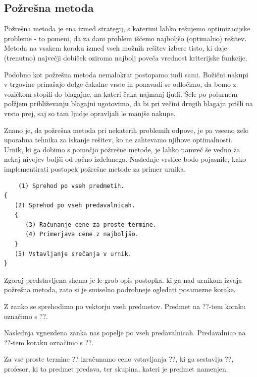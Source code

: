 \documentclass[a4paper, 10pt]{article}
\begin{document}
\subsection{Požrešna metoda}%

Požrešna metoda je ena izmed strategij, s katerimi lahko rešujemo optimizacijske probleme -
to pomeni, da za dani problem iščemo najboljšo (optimalno) rešitev. Metoda na vsakem koraku
izmed vseh možnih rešitev izbere  tisto, ki daje (trenutno) največji dobiček oziroma najbolj
poveča vrednost kriterijske funkcije.

Podobno kot požrešna metoda nemalokrat postopamo tudi sami. Božični nakupi v trgovine
prinašajo dolge čakalne vrste in ponavadi se odločimo, da bomo z vozičkom stopili do blagajne,
na kateri čaka najmanj ljudi. Šele po polurnem polžjem približevanju blagajni ugotovimo,
da bi pri večini drugih blagajn prišli na vrsto prej, saj so tam ljudje opravljali le
manjše nakupe.

Znano je, da požrešna metoda pri nekaterih problemih odpove, je pa vseeno zelo uporabna
tehnika za iskanje rešitev, ko ne zahtevamo njihove optimalnosti. Urnik, ki ga dobimo s
pomočjo požrešne metode, je lahko namreč še vedno za nekaj nivojev boljši od ročno izdelanega.
Naslednje vrstice bodo pojasnile, kako implementirati postopek požrešne metode za primer urnika.

\begin{verbatim}
	(1) Sprehod po vseh predmetih.
{
   (2) Sprehod po vseh predavalnicah.
   {
      (3) Računanje cene za proste termine.
      (4) Primerjava cene z najboljšo.
   }
   (5) Vstavljanje srečanja v urnik.
}
\end{verbatim}
%
Zgoraj predstavljena shema je le grob opis postopka, ki ga nad urnikom izvaja požrešna metoda,
zato si je smiselno podrobneje ogledati posamezne korake.

   Z zanko se sprehodimo po vektorju vseh predmetov. Predmet na ??-tem koraku
   označimo s ??.

   Naslednja vgnezdena zanka nas popelje po vseh predavalnicah. Predavalnico na
   ??-tem koraku označimo s ??.

   Za vse proste termine ?? izračunamo ceno vstavljanja
   ??, ki ga sestavlja ??, profesor, ki ta predmet predava,
   ter skupina, kateri je predmet namenjen.
\end{document}
